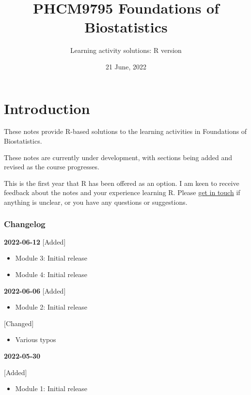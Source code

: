 \documentclass[
]{memoir}
\title{PHCM9795 Foundations of Biostatistics}
\author{Learning activity solutions: R version}
\date{21 June, 2022}
\providecommand{\tightlist}{%
  \setlength{\itemsep}{0pt}\setlength{\parskip}{0pt}}
\begin{document}
\maketitle

{
\setcounter{tocdepth}{1}
\tableofcontents
}
\hypertarget{introduction}{%
\chapter*{Introduction}\label{introduction}}

These notes provide R-based solutions to the learning activities in Foundations of Biostatistics.

These notes are currently under development, with sections being added and revised as the course progresses.

This is the first year that R has been offered as an option. I am keen to receive feedback about the notes and your experience learning R. Please \href{mailto:t.dobbins@unsw.edu.au}{get in touch} if anything is unclear, or you have any questions or suggestions.

\hypertarget{changelog}{%
\subsection*{Changelog}\label{changelog}}

\textbf{2022-06-12}
{[}Added{]}

\begin{itemize}
\tightlist
\item
  Module 3: Initial release
\item
  Module 4: Initial release
\end{itemize}

\textbf{2022-06-06}
{[}Added{]}

\begin{itemize}
\tightlist
\item
  Module 2: Initial release
\end{itemize}

{[}Changed{]}

\begin{itemize}
\tightlist
\item
  Various typos
\end{itemize}

\textbf{2022-05-30}

{[}Added{]}

\begin{itemize}
\tightlist
\item
  Module 1: Initial release
\end{itemize}
\end{document}
